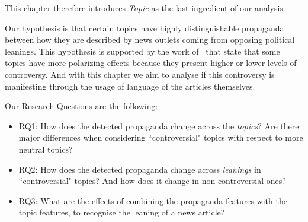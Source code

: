 This chapter therefore introduces \emph{Topic} as the last ingredient of our analysis.

Our hypothesis is that certain topics have highly distinguishable propaganda between how they are described by news outlets coming from opposing political leanings.
This hypothesis is supported by the work of~\cite{garimella2018quantifying,treuillier2022being} that state that some topics have more polarizing effects because they present higher or lower levels of controversy.
And with this chapter we aim to analyse if this controversy is manifesting through the usage of language of the articles themselves.







Our Research Questions are the following: 
\begin{itemize}
    \item RQ1: How does the detected propaganda change across the \emph{topics}? Are there major differences when considering ``controversial" topics with respect to more neutral topics?
    \item RQ2: How does the detected propaganda change across \emph{leanings} in ``controversial" topics? And how does it change in non-controversial ones?
    \item RQ3: What are the effects of combining the propaganda features with the topic features, to recognise the leaning of a news article?
\end{itemize}

